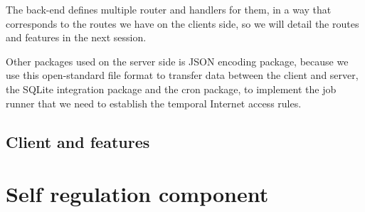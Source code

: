 The back-end defines multiple router and handlers for them, in a way that corresponds to the routes we have on the clients side, so we will detail the routes and features in the next session.

Other packages used on the server side is JSON encoding package, because we use this open-standard file format to transfer data between the client and server, the SQLite integration package and the cron package, to implement the job runner that we need to establish the temporal Internet access rules.

\subsection{Client and features}

\section{Self regulation component}


